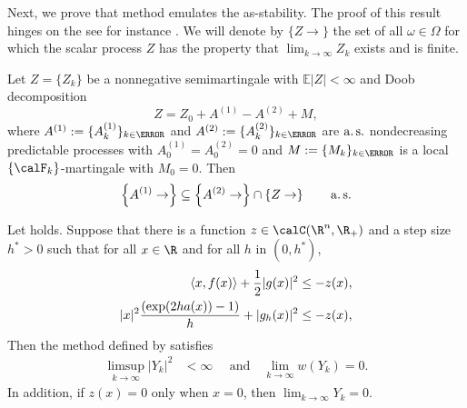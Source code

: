 	Next, %
we prove that \SM method emulates the as-stability.
The proof of this result hinges on the  see for instance 
\cite[Th. 7, pg. 139]{Liptser1989}.
We will denote by  $\{Z\to\}$ the set of all $\omega \in \Omega$ for which the scalar process $Z$ has the property that
$\lim_{k\to\infty} Z_k$ exists and is finite.
\begin{lem}
	\label{lem:MartingaleConvergence}
	Let $Z= \{Z_k\}$ be a nonnegative semimartingale with $\mathbb{E}|Z|<\infty$ and Doob decomposition 
	$$
		Z = Z_0 + A^{(1)} -A^{(2)} + M,
	$$
	where 
	$A^{(1)}:=\{A_k^{(1)}\}_{k\in \N}$ and $A^{(2)}:=\{A_k^{(2)}\}_{k\in \N}$ are $\operatorname*{a.s.}$ nondecreasing predictable
	processes with $A_0^{(1)}=A_0^{(2)}=0$ and $M:=\{M_k\}_{k\in\N}$ is a local $\{\calF_k\}$-martingale with $M_0=0$.
	Then
	\begin{equation*}
		\left\{
				A^{(1)} \to
		\right\}
		\subseteq
		\left\{
				A^{(2)} \to
		\right\}\cap
		\left\{
			Z \to
		\right\} \qquad \operatorname*{a.s.}
\end{equation*}
\end{lem}
\begin{thm}\label{thm:AlmosSurleyStability}
		Let  holds. Suppose that there is a function 
		$z \in \calC(\R^n,\R_+)$ 
		and a step size $h^*>0$ such that for all $x\in \R$ and for all $h$ in $(0,h^*)$,
		\begin{align} 
			\left\langle x, f(x)\right\rangle + \frac{1}{2}|g(x)|^2
			&\leq -z(x), \label{eqn:ConditionStability1}\\
			|x|^2
			\frac{(\exp(2 h a(x))-1)}{h}
			+|g_h(x)|^2
			&\leq
				-z(x), \label{eqn:ConditionStability2}
		\end{align}
	Then the \SM method defined by  satisfies
	\begin{align*}
		\limsup_{k\to \infty}
			|Y_k|^2 
			& <\infty \quad\text{ and} 
			\quad
		\lim_{k\to \infty}
			w(Y_k) =0. 
	\end{align*}
In addition, if $z(x)=0$ only when $x=0$, then
	$ \displaystyle
		\lim_{k\to \infty} Y_k = 0.
	$
\end{thm}
